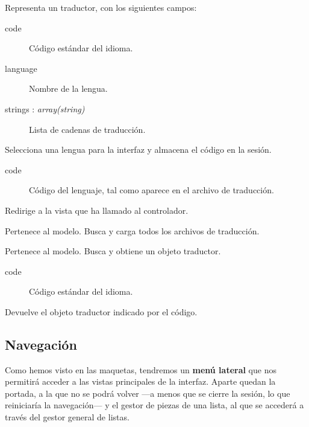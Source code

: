\begin{description}[style=nextline]
	\item[Estructura \textit{Translator}]
	Representa un traductor, con los siguientes campos:
	
	\begin{description}
		\item[code] Código estándar del idioma.
		\item[language] Nombre de la lengua.
		\item[strings : \textit{array(string)}] Lista de cadenas de traducción.
	\end{description}
	
	\item[language (code)]
	Selecciona una lengua para la interfaz y almacena el código en la sesión.
	
	\begin{description}
		\item[code] Código del lenguaje, tal como aparece en el archivo de traducción.
	\end{description}
	
	Redirige a la vista que ha llamado al controlador.
	
	\item[translator ()]
	Pertenece al modelo. Busca y carga todos los archivos de traducción.
	
	\item[get\_translator (code)]
	Pertenece al modelo. Busca y obtiene un objeto traductor.
	
	\begin{description}
		\item[code] Código estándar del idioma.
	\end{description}
	
	Devuelve el objeto traductor indicado por el código.
\end{description}

\subsection{Navegación}

Como hemos visto en las maquetas, tendremos un \textbf{menú lateral} que nos permitirá acceder a las vistas principales de la interfaz. Aparte quedan la portada, a la que no se podrá volver ---a menos que se cierre la sesión, lo que reiniciaría la navegación--- y el gestor de piezas de una lista, al que se accederá a través del gestor general de listas.


